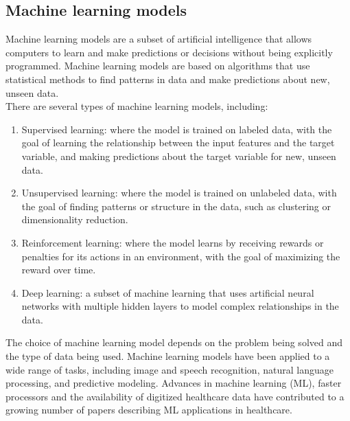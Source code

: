     \subsection{Machine learning models} \label{sec:longlp}
    Machine learning models are a subset of artificial intelligence that allows computers to learn and make predictions or decisions without being
    explicitly programmed. Machine learning models are based on algorithms that use statistical methods to find patterns in data and make predictions
    about new, unseen data.
    \\
    There are several types of machine learning models, including:
    \begin{enumerate}
        \item Supervised learning: where the model is trained on labeled data, with the goal of learning the relationship between the input features and the target variable, and making predictions about the target variable for new, unseen data.
        \item Unsupervised learning: where the model is trained on unlabeled data, with the goal of finding patterns or structure in the data, such as clustering or dimensionality reduction.
        \item Reinforcement learning: where the model learns by receiving rewards or penalties for its actions in an environment, with the goal of maximizing the reward over time.
        \item Deep learning: a subset of machine learning that uses artificial neural networks with multiple hidden layers to model complex relationships in the data.
    \end{enumerate}
    The choice of machine learning model depends on the problem being solved and the type of data being used. Machine learning models have been
    applied to a wide range of tasks, including image and speech recognition, natural language processing, and predictive modeling.
    Advances in machine learning (ML), faster processors and the availability of digitized healthcare data have contributed to a growing number of papers describing ML applications in healthcare.~\cite{Chen}
